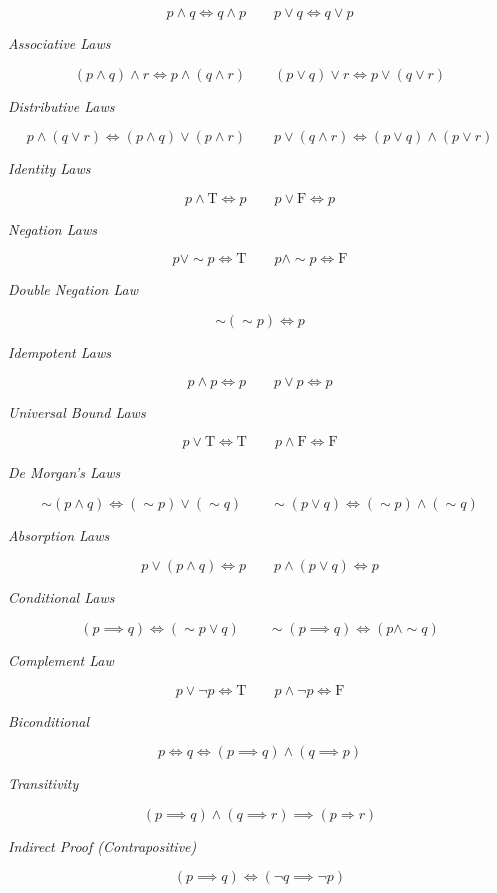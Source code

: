 \[
	p \land q \iff q \land p \qquad p \lor q \iff q \lor p
\]

\emph{Associative Laws}

\[
	(p \land q) \land r \iff p \land (q \land r) \qquad (p \lor q) \lor r \iff p \lor (q \lor r)
\]

\emph{Distributive Laws}

\[
	p \land (q \lor r) \iff (p \land q) \lor (p \land r) \qquad
	p \lor (q \land r) \iff (p \lor q) \land (p \lor r)
\]

\emph{Identity Laws}

\[
	p \land \text{T} \iff p \qquad p \lor \text{F} \iff p
\]

\emph{Negation Laws}

\[
	p \lor \sim p \iff \text{T} \qquad p \land \sim p \iff \text{F}
\]

\emph{Double Negation Law}

\[
	\sim(\sim p) \iff p
\]

\emph{Idempotent Laws}

\[
	p \land p \iff p \qquad p \lor p \iff p
\]

\emph{Universal Bound Laws}

\[
	p \lor \text{T} \iff \text{T} \qquad p \land \text{F} \iff \text{F}
\]

\emph{De Morgan’s Laws}

\[
	\sim (p \land q) \iff (\sim p) \lor (\sim q) \qquad
	\sim (p \lor q) \iff (\sim p) \land (\sim q)
\]

\emph{Absorption Laws}

\[
	p \lor (p \land q) \iff p \qquad p \land (p \lor q) \iff p
\]

\emph{Conditional Laws}

\[
	(p \implies q) \iff (\sim p \lor q) \qquad \sim(p \implies q) \iff (p \land \sim q)
\]

\emph{Complement Law}

\[
	p \lor \neg p \iff \text{T} \qquad p \land \neg p \iff \text{F}
\]

\emph{Biconditional}

\[
	p \iff q \iff (p \implies q) \land (q \implies p)
\]

\emph{Transitivity}

\[
	(p \implies q) \land (q \implies r) \implies (p \Rightarrow r)
\]

\emph{Indirect Proof (Contrapositive)}

\[
	(p \implies q) \iff (\neg q \implies \neg p)
\]

